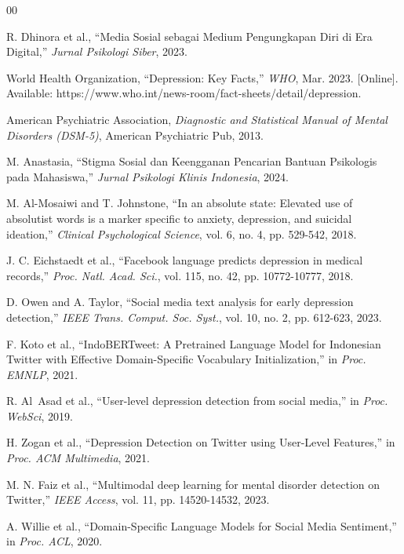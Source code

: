 \documentclass[conference]{IEEEtran}
\begin{document}
\begin{thebibliography}{00}

R. Dhinora et al., ``Media Sosial sebagai Medium Pengungkapan Diri di Era Digital,'' \emph{Jurnal Psikologi Siber}, 2023.

World Health Organization, ``Depression: Key Facts,'' \emph{WHO}, Mar. 2023. [Online]. Available: https://www.who.int/news-room/fact-sheets/detail/depression.

American Psychiatric Association, \emph{Diagnostic and Statistical Manual of Mental Disorders (DSM-5)}, American Psychiatric Pub, 2013.

M. Anastasia, ``Stigma Sosial dan Keengganan Pencarian Bantuan Psikologis pada Mahasiswa,'' \emph{Jurnal Psikologi Klinis Indonesia}, 2024.

M. Al-Mosaiwi and T. Johnstone, ``In an absolute state: Elevated use of absolutist words is a marker specific to anxiety, depression, and suicidal ideation,'' \emph{Clinical Psychological Science}, vol. 6, no. 4, pp. 529-542, 2018.

J. C. Eichstaedt et al., ``Facebook language predicts depression in medical records,'' \emph{Proc. Natl. Acad. Sci.}, vol. 115, no. 42, pp. 10772-10777, 2018.

D. Owen and A. Taylor, ``Social media text analysis for early depression detection,'' \emph{IEEE Trans. Comput. Soc. Syst.}, vol. 10, no. 2, pp. 612-623, 2023.

F. Koto et al., ``IndoBERTweet: A Pretrained Language Model for Indonesian Twitter with Effective Domain-Specific Vocabulary Initialization,'' in \emph{Proc. EMNLP}, 2021.

R. Al~Asad et al., ``User-level depression detection from social media,'' in \emph{Proc. WebSci}, 2019.

H. Zogan et al., ``Depression Detection on Twitter using User-Level Features,'' in \emph{Proc. ACM Multimedia}, 2021.

M. N. Faiz et al., ``Multimodal deep learning for mental disorder detection on Twitter,'' \emph{IEEE Access}, vol. 11, pp. 14520-14532, 2023.

A. Willie et al., ``Domain-Specific Language Models for Social Media Sentiment,'' in \emph{Proc. ACL}, 2020.


\end{thebibliography}
\end{document}
